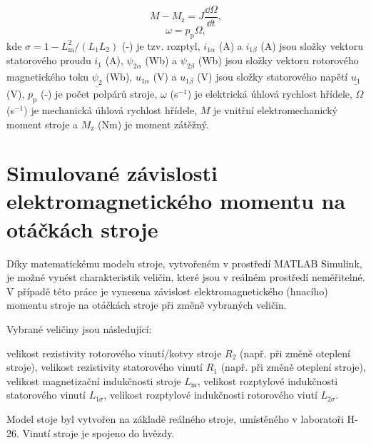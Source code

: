\documentclass[a4paper, twoside, 11pt]{article}
\begin{document}
\begin{equation}
    M - M_\text{z} = J \frac{\dd{\Omega}}{\dd{t}},
\end{equation}
\begin{equation}
    \omega = p_\text{p} \Omega,
\end{equation}
kde $\sigma = 1 - L_\text{m}^{2}/(L_1 L_2)$ (-) je tzv. rozptyl, $i_{1\alpha}$ (A) a $i_{1\beta}$ (A) jsou složky vektoru statorového proudu $\underline{i_1}$ (A), $\psi_{2\alpha}$ (Wb) a $\psi_{2\beta}$ (Wb) jsou složky vektoru rotorového magnetického toku $\underline{\psi_2}$ (Wb), $u_{1\alpha}$ (V) a $u_{1\beta}$ (V) jsou složky statorového napětí $\underline{u_1}$ (V), $p_\text{p}$ (-) je počet polpárů stroje, $\omega$ (s$^{-1}$) je elektrická úhlová rychlost hřídele, $\Omega$ (s$^{-1}$) je mechanická úhlová rychlost hřídele, $M$ je vnitřní elektromechanický moment stroje a $M_\text{z}$ (Nm) je moment zátěžný.


\section{Simulované závislosti elektromagnetického momentu na otáčkách stroje}
    Díky matematickému modelu stroje, vytvořeném v prostředí MATLAB Simulink, je možné vynést charakteristik veličin, které jsou v reálném prostředí neměřitelné. V případě této práce je vynesena závislost elektromagnetického (hnacího) momentu stroje na otáčkách stroje při změně vybraných veličin.\par
    Vybrané veličiny jsou následující:
    \begin{itemize}
            velikost rezistivity rotorového vinutí/kotvy stroje $R_2$ (např. při změně oteplení stroje),
            velikost rezistivity statorového vinutí $R_1$ (např. při změně oteplení stroje),
            velikost magnetizační indukčnosti stroje $L_\text{m}$,
            velikost rozptylové indukčnosti statorového vinutí $L_{1\sigma}$,
            velikost rozptylové indukčnosti rotorového viutí $L_{2\sigma}$.
    \end{itemize}

    Model stoje byl vytvořen na základě reálného stroje, umístěného v laboratoři H-26. Vinutí stroje je spojeno do hvězdy.\par
\end{document}
